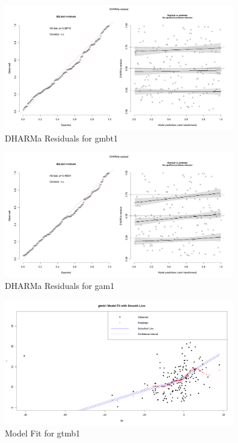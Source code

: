 \begin{figure}[h]
    \centering
    \includegraphics[width=0.9\textwidth]{visuals/DHARMa_gmbt1.png}
    \caption{DHARMa Residuals for gmbt1}
    \label{fig:dharmagmbt1}
\end{figure}

\begin{figure}[h]
    \centering
    \includegraphics[width=0.9\textwidth]{visuals/DHARMa_gam1.png}
    \caption{DHARMa Residuals for gam1}
    \label{fig:dharmagam1}
\end{figure}

\begin{figure}[h]
    \centering
    \includegraphics[width=0.9\textwidth]{visuals/modfit_gtmb1.png}
    \caption{Model Fit for gtmb1}
    \label{fig:modfitgtmb1}
\end{figure}

